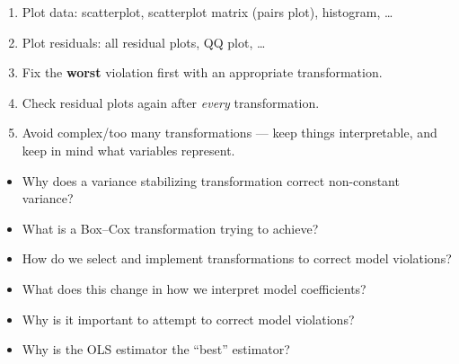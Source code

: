 \begin{enumerate}
    \item Plot data: scatterplot, scatterplot matrix (pairs plot), histogram, \dots
    \item Plot residuals: all residual plots, QQ plot, \dots
    \item Fix the \textbf{worst} violation first with an appropriate transformation.
    \item Check residual plots again after \emph{every} transformation.
    \item Avoid complex/too many transformations --- keep things interpretable, and
    keep in mind what variables represent.
\end{enumerate}

\begin{remark}
    \begin{itemize}
        \item Why does a variance stabilizing transformation correct non-constant variance?
        \item What is a Box--Cox transformation trying to achieve?
        \item How do we select and implement transformations to correct model violations?
        \item What does this change in how we interpret model coefficients?
        \item Why is it important to attempt to correct model violations?
        \item Why is the OLS estimator the ``best'' estimator?
    \end{itemize}
\end{remark}
